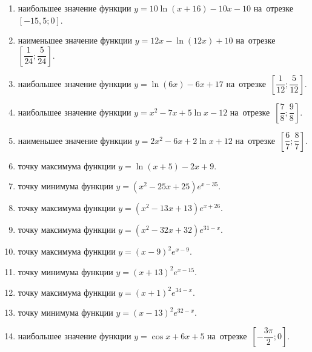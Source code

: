 \documentclass[a4paper,10pt]{article}
\begin{document}
\begin{enumerate}
\item {} наибольшее значение функции $y = 10\ln \left(x+16\right)-10x -10$ на~отрезке~$\left[-15,5;0\right]$.

\item {} наименьшее значение функции $y = 12x-\ln \left(12x\right)+10$ на~отрезке~$\left[\dfrac{1}{24};\dfrac{5}{24}\right]$.

\item {} наибольшее значение функции $y = \ln \left(6x\right)-6x+17$ на~отрезке~$\left[\dfrac{1}{12};\dfrac{5}{12}\right]$.

\item {} наибольшее значение функции $y=x^2-7x+5\ln x-12$ на~отрезке~$\left[\dfrac{7}{8};\dfrac{9}{8}\right]$.

\item {} наименьшее значение функции $y=2x^2-6x+2\ln x+12$ на~отрезке~$\left[\dfrac{6}{7};\dfrac{8}{7}\right]$.

\item {} точку максимума функции $y=\ln \left(x+5\right)-2x+9$.







\item {} точку минимума функции $y=\left(x^2-25x+25\right)e^{x-35}$.

\item {} точку максимума функции $y=\left(x^2-13x+13\right)e^{x+26}$.

\item {} точку максимума функции $y=\left(x^2-32x+32\right)e^{31-x}$.

\item {} точку максимума функции $y=\left(x -9\right)^2e^{x-9}$.

\item {} точку минимума функции $y=\left(x +13\right)^2e^{x-15}$.

\item {} точку максимума функции $y=\left(x +1\right)^2e^{34-x}$.

\item {} точку минимума функции $y=\left(x -13\right)^2e^{32-x}$.

\item {} наибольшее значение функции $y=\cos x+6x +5$ на~отрезке~$\left[-\dfrac{3\pi }{2};0\right]$.


\end{enumerate}
\end{document}
